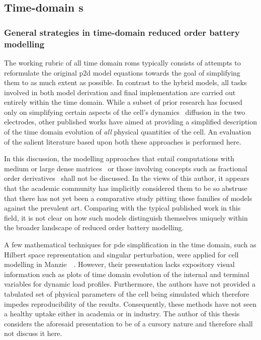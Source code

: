 \subsection{Time-domain  s}\label{subsec:timedomainroms}

\subsubsection*{General strategies in time-domain reduced order battery modelling}

The working rubric of all time domain \glspl{rom} typically consists of attempts
to  reformulate the  original  \gls{p2d}  model equations  towards  the goal  of
simplifying  them to  as much  extent  as possible.  In contrast  to the  hybrid
models, all tasks involved in both model derivation and final implementation are
carried out  entirely within the time  domain. While a subset  of prior research
has  focused  only  on  simplifying  certain  aspects  of  the  cell's  dynamics
\eg~diffusion  in  the two  electrodes,  other  published  works have  aimed  at
providing a  simplified description of  the time domain evolution  of \emph{all}
physical quantities of  the cell. An evaluation of the  salient literature based
upon both these approaches is performed here.


In  this discussion,  the  modelling approaches  that  entail computations  with
medium or large dense matrices~\cite{Li2016,Xu2016,Corno2015} or those involving
concepts such  as fractional  order derivatives~\cite{Sabatier2014,Sabatier2015,
Li2017, Mu2017, Wang2017}  shall not be discussed. In the  views of this author,
it appears that  the academic community has implicitly considered  them to be so
abstruse that there has not yet  been a comparative study pitting these families
of models against  the prevalent art. Comparing with the  typical published work
in  this field,  it  is not  clear  on how  such  models distinguish  themselves
uniquely within the broader landscape of reduced order battery modelling.


A few mathematical  techniques for \gls{pde} simplification in  the time domain,
such as Hilbert space representation and singular perturbation, were applied for
cell  modelling in  Manzie~\etal~\cite{Manzie2015}. However,  their presentation
lacks expository  visual information such as  plots of time domain  evolution of
the internal and terminal variables  for dynamic load profiles. Furthermore, the
authors  have  not provided  a  tabulated  set  of  physical parameters  of  the
cell being  simulated which  therefore impedes  reproducibility of  the results.
Consequently, these methods have not seen a healthy uptake either in academia or
in industry. The  author of this thesis  considers the aforesaid presentation to
be of a cursory nature  and therefore  shall  not discuss it here.

